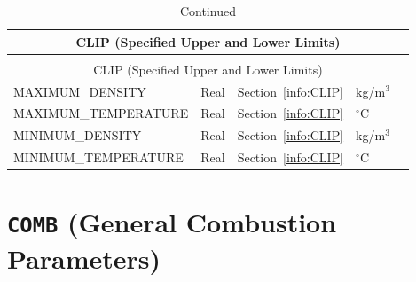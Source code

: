 \documentclass[11pt]{book}
\begin{document}
\begin{longtable}{@{\extracolsep{\fill}}|l|l|l|l|l|}
\caption[Clipping parameters ({\ct CLIP} namelist group)]{For more information see Section~\ref{info:CLIP}.}
\label{tbl:CLIP} \\
\hline
\multicolumn{5}{|c|}{{\ct CLIP} (Specified Upper and Lower Limits)} \\
\hline \hline
\endfirsthead
\caption[]{Continued} \\
\hline
\multicolumn{5}{|c|}{{\ct CLIP} (Specified Upper and Lower Limits)} \\
\hline \hline
\endhead
{\ct MAXIMUM\_DENSITY}              & Real           & Section~\ref{info:CLIP}      & kg/m$^3$   &     \\ \hline
{\ct MAXIMUM\_TEMPERATURE}          & Real           & Section~\ref{info:CLIP}      & $^\circ$C  &     \\ \hline
{\ct MINIMUM\_DENSITY}              & Real           & Section~\ref{info:CLIP}      & kg/m$^3$   &     \\ \hline
{\ct MINIMUM\_TEMPERATURE}          & Real           & Section~\ref{info:CLIP}      & $^\circ$C  &     \\ \hline
\end{longtable}

\vspace{\baselineskip}


\section{\texorpdfstring{{\tt COMB}}{COMB} (General Combustion Parameters)}
\end{document}
